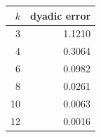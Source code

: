 \begin{tabular}{r r}
\toprule
$k$ & dyadic error \\
\midrule
3 & 1.1210 \\
4 & 0.3064 \\
6 & 0.0982 \\
8 & 0.0261 \\
10 & 0.0063 \\
12 & 0.0016 \\
\bottomrule
\end{tabular}
